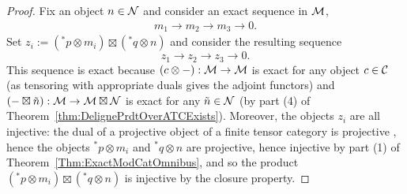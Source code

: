 \documentclass{amsart}
\begin{document}
\begin{proof}
Fix an object $n \in \mathcal N$ and consider an exact sequence in $\mathcal M$,
\begin{align*}
	m_1 \to m_2 \to m_3 \to 0. 
\end{align*}
Set $z_i := ({}^* p \otimes m_i) \boxtimes ({}^* q \otimes n)$ and consider the resulting sequence
\begin{equation*}
	z_1 \to z_2 \to z_3 \to 0.
\end{equation*}
This sequence is exact because $(c \otimes -): \mathcal M \rightarrow \mathcal M$ is exact for any object $c \in \mathcal C$ (as tensoring with appropriate duals gives the adjoint functors) and $(- \boxtimes \tilde{n}) : \mathcal M \rightarrow \mathcal M \boxtimes \mathcal N$ is exact for any $\tilde{n} \in \mathcal N$ (by part (4) of Theorem~\ref{thm:DelignePrdtOverATCExists}).  Moreover, the objects $z_i$ are all injective: the dual of a projective object of a finite tensor category is projective \cite[Prop. 2.3]{EO-ftc}, hence the objects ${}^* p \otimes m_i$ and ${}^* q \otimes n$ are projective, hence injective by part (1) of Theorem~\ref{Thm:ExactModCatOmnibus}, and so the product $({}^* p \otimes m_i) \boxtimes ({}^* q \otimes n)$ is injective by the closure property.


\end{proof}
\end{document}
